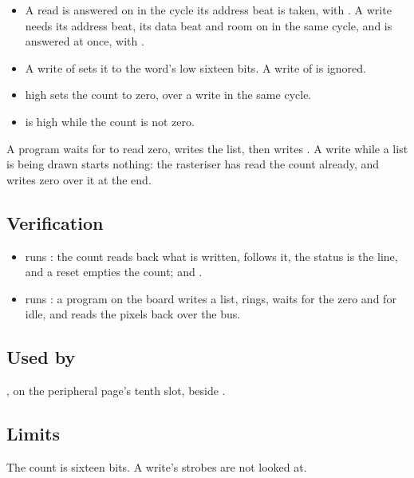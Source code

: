 \begin{itemize}
\item A read is answered on  in the cycle its address
beat is taken, with . A write needs its address beat, its
data beat and room on  in the same cycle, and is answered
at once, with .
\item A write of  sets it to the word's low sixteen bits.
A write of  is ignored.
\item {} high sets the count to zero, over a write in the same
cycle.
\item {} is high while the count is not zero.
\end{itemize}

A program waits for  to read zero, writes the list, then
writes . A write while a list is being drawn starts
nothing: the rasteriser has read the count already, and writes zero
over it at the end.

\subsection*{Verification}

\begin{itemize}
\item {} runs
:
the count reads back what is written,  follows it, the
status is the line, and a reset empties the count; and
.
\item {} runs
: a program on the
board writes a list, rings, waits for the zero and for idle, and reads
the pixels back over the bus.
\end{itemize}

\subsection*{Used by}

, on the peripheral page's tenth slot,
beside .

\subsection*{Limits}

The count is sixteen bits. A write's strobes are not looked at.
